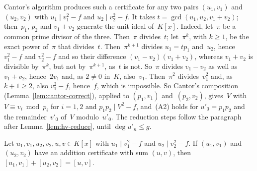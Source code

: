 Cantor's algorithm produces such a certificate for any two pairs $(u_1, v_1)$ and~$(u_2, v_2)$
with $u_1 \mid v_1^2 - f$ and $u_2 \mid v_2^2 - f$. It takes $t = \gcd(u_1, u_2, v_1 + v_2)$;
then~$p_1$, $p_2$ and $v_1 + v_2$ generate the unit ideal of~$K[x]$. Indeed, let~$\pi$ be a common
prime divisor of the three. Then~$\pi$ divides~$t$; let~$\pi^k$, with $k \ge 1$, be the exact
power of~$\pi$ that divides~$t$. Then~$\pi^{k+1}$ divides $u_1 = t p_1$ and~$u_2$, hence
$v_1^2 - f$ and $v_2^2 - f$ and so their difference $(v_1 - v_2)(v_1 + v_2)$, whereas
$v_1 + v_2$ is divisible by~$\pi^k$, but not by~$\pi^{k+1}$, as~$t$ is not. So~$\pi$ divides
$v_1 - v_2$ as well as $v_1 + v_2$, hence~$2v_1$ and, as $2 \ne 0$ in~$K$, also~$v_1$.
Then~$\pi^2$ divides~$v_1^2$ and, as $k + 1 \ge 2$, also $v_1^2 - f$, hence~$f$, which is
impossible. So Cantor's composition (Lemma~\ref{lem:cantor-correct}), applied to $(p_1, v_1)$
and~$(p_2, v_2)$, gives~$V$ with $V \equiv v_i \bmod p_i$ for $i = 1, 2$ and
$p_1 p_2 \mid V^2 - f$, and~(A2) holds for $u'_0 = p_1 p_2$ and the remainder~$v'_0$ of~$V$
modulo~$u'_0$. The reduction steps follow the paragraph after Lemma~\ref{lem:hv-reduce}, until
$\deg u'_n \le g$.

\begin{theorem}
\label{thm:hv-add}
\leanok
{}
Let $u_1, v_1, u_2, v_2, u, v \in K[x]$ with $u_1 \mid v_1^2 - f$ and $u_2 \mid v_2^2 - f$. If
$(u_1, v_1)$ and~$(u_2, v_2)$ have an addition certificate with sum $(u, v)$, then
$[u_1, v_1] + [u_2, v_2] = [u, v]$.
\end{theorem}

